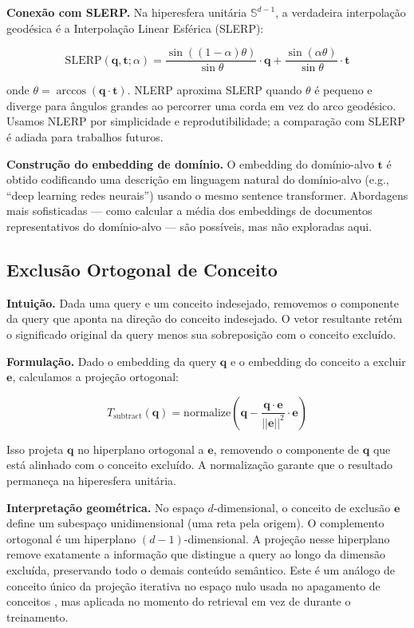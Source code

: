 \documentclass{article}
\begin{document}
\textbf{Conexão com SLERP.} Na hiperesfera unitária $\mathbb{S}^{d-1}$, a verdadeira interpolação geodésica é a Interpolação Linear Esférica (SLERP):

\begin{equation}
\text{SLERP}(\mathbf{q}, \mathbf{t}; \alpha) = \frac{\sin((1-\alpha)\theta)}{\sin\theta} \cdot \mathbf{q} + \frac{\sin(\alpha\theta)}{\sin\theta} \cdot \mathbf{t}
\end{equation}

onde $\theta = \arccos(\mathbf{q} \cdot \mathbf{t})$. NLERP aproxima SLERP quando $\theta$ é pequeno e diverge para ângulos grandes ao percorrer uma corda em vez do arco geodésico. Usamos NLERP por simplicidade e reprodutibilidade; a comparação com SLERP é adiada para trabalhos futuros.

\textbf{Construção do embedding de domínio.} O embedding do domínio-alvo $\mathbf{t}$ é obtido codificando uma descrição em linguagem natural do domínio-alvo (e.g., ``deep learning redes neurais'') usando o mesmo sentence transformer. Abordagens mais sofisticadas --- como calcular a média dos embeddings de documentos representativos do domínio-alvo --- são possíveis, mas não exploradas aqui.

\subsection{Exclusão Ortogonal de Conceito}

\textbf{Intuição.} Dada uma query e um conceito indesejado, removemos o componente da query que aponta na direção do conceito indesejado. O vetor resultante retém o significado original da query menos sua sobreposição com o conceito excluído.

\textbf{Formulação.} Dado o embedding da query $\mathbf{q}$ e o embedding do conceito a excluir $\mathbf{e}$, calculamos a projeção ortogonal:

\begin{equation}
T_{\text{subtract}}(\mathbf{q}) = \text{normalize}\left(\mathbf{q} - \frac{\mathbf{q} \cdot \mathbf{e}}{||\mathbf{e}||^2} \cdot \mathbf{e}\right)
\end{equation}

Isso projeta $\mathbf{q}$ no hiperplano ortogonal a $\mathbf{e}$, removendo o componente de $\mathbf{q}$ que está alinhado com o conceito excluído. A normalização garante que o resultado permaneça na hiperesfera unitária.

\textbf{Interpretação geométrica.} No espaço $d$-dimensional, o conceito de exclusão $\mathbf{e}$ define um subespaço unidimensional (uma reta pela origem). O complemento ortogonal é um hiperplano $(d-1)$-dimensional. A projeção nesse hiperplano remove exatamente a informação que distingue a query ao longo da dimensão excluída, preservando todo o demais conteúdo semântico. Este é um análogo de conceito único da projeção iterativa no espaço nulo usada no apagamento de conceitos \cite{ravfogel2022}, mas aplicada no momento do retrieval em vez de durante o treinamento.
\end{document}
